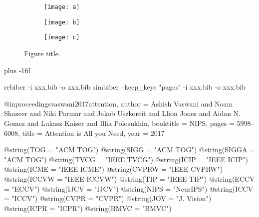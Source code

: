 \begin{figure}[t]
     \centering
     \begin{subfigure}[b]{0.38\textwidth}
         \centering
         \texttt{[image: a]}
         \caption{}
         \label{fig:categories_dist}
     \end{subfigure}
     \hfill
     \begin{subfigure}[b]{0.3\textwidth}
         \centering
         \texttt{[image: b]}
         \vspace{0.3pt}
         \caption{}
         \label{fig:worldcloud}
     \end{subfigure}
    \hfill
     \begin{subfigure}[b]{0.3\textwidth}
         \centering
         \texttt{[image: c]}
         \caption{}
         \label{fig:steps_dist}
     \end{subfigure}

    \caption{Figure title.}
    
    \label{fig:distributions}
\end{figure}



\baselineskip plus -1fil

rebiber -i xxx.bib -o xxx.bib
simbiber --keep_keys "pages" -i xxx.bib -o xxx.bib

@inproceedings{vaswani2017attention,
 author = {Ashish Vaswani and Noam Shazeer and Niki Parmar and Jakob Uszkoreit and Llion Jones and Aidan N. Gomez and Lukasz Kaiser and Illia Polosukhin},
 booktitle = NIPS,
 pages = {5998--6008},
 title = {Attention is All you Need},
 year = {2017}
}

@string(TOG = "{ACM TOG}")
@string(SIGG = "{ACM TOG}")
@string(SIGGA = "{ACM TOG}")
@string(TVCG = "{IEEE TVCG}")
@string(ICIP = "{IEEE ICIP}")
@string(ICME = "{IEEE ICME}")
@string(CVPRW = "{IEEE CVPRW}")
@string(ICCVW = "{IEEE ICCVW}")
@string(TIP = "{IEEE TIP}")
@string(ECCV = "{ECCV}")
@string(IJCV = "{IJCV}")
@string(NIPS = "{NeurIPS}")
@string(ICCV = "{ICCV}")
@string(CVPR = "{CVPR}")
@string(JOV = "{J. Vision}")
@string(ICPR = "{ICPR}")
@string(BMVC =	"{BMVC}")

